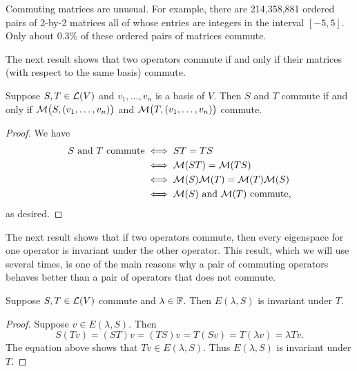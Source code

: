 %
Commuting matrices are unusual. For example, there are 214,358,881 ordered
pairs of 2-by-2 matrices all of whose entries are integers in the interval
$[-5,5]$. Only about $0.3\%$ of these ordered pairs of matrices commute.

The next result shows that two operators commute if and only if their matrices
(with respect to the same basis) commute.

\begin{result}\label{ax:5.74}
Suppose $S,T\in\mathcal{L}(V)$ and $v_1,\dots,v_n$ is a basis of $V$. Then $S$ and $T$
commute if and only if $\mathcal{M}\bigl(S,(v_1,\allowbreak\dots,v_n)\bigr)$ and
$\mathcal{M}\bigl(T,(v_1,\dots,v_n)\bigr)$ commute.
\end{result}

\begin{proof}
We have
\begin{align*}
S\text{ and }T\text{ commute} &\iff ST=TS\\
  &\iff \mathcal{M}(ST)=\mathcal{M}(TS)\\
  &\iff \mathcal{M}(S)\mathcal{M}(T)=\mathcal{M}(T)\mathcal{M}(S)\\
  &\iff \mathcal{M}(S)\text{ and }\mathcal{M}(T)\text{ commute},
\end{align*}
as desired.
\end{proof}

The next result shows that if two operators commute, then every eigenspace for
one operator is invariant under the other operator. This result, which we will
use several times, is one of the main reasons why a pair of commuting operators
behaves better than a pair of operators that does not commute.

\begin{result}\label{ax:5.75}
Suppose $S,T\in\mathcal{L}(V)$ commute and $\lambda\in\mathbb{F}$. Then $E(\lambda,S)$ is
invariant under $T$.
\end{result}

\begin{proof}
Suppose $v\in E(\lambda,S)$. Then
\[ S(Tv) = (ST)v = (TS)v = T(Sv) = T(\lambda v) = \lambda Tv. \]
The equation above shows that $Tv\in E(\lambda,S)$. Thus $E(\lambda,S)$ is
invariant under $T$.
\end{proof}

